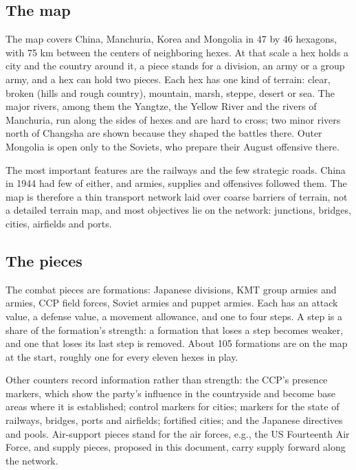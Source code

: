 \documentclass[11pt]{article}
\begin{document}
\subsection*{The map}
The map covers China, Manchuria, Korea and Mongolia in 47 by 46 hexagons, with 75 km between the centers of neighboring hexes. At that scale a hex holds a city and the country around it, a piece stands for a division, an army or a group army, and a hex can hold two pieces. Each hex has one kind of terrain: clear, broken (hills and rough country), mountain, marsh, steppe, desert or sea. The major rivers, among them the Yangtze, the Yellow River and the rivers of Manchuria, run along the sides of hexes and are hard to cross; two minor rivers north of Changsha are shown because they shaped the battles there. Outer Mongolia is open only to the Soviets, who prepare their August offensive there.

The most important features are the railways and the few strategic roads. China in 1944 had few of either, and armies, supplies and offensives followed them. The map is therefore a thin transport network laid over coarse barriers of terrain, not a detailed terrain map, and most objectives lie on the network: junctions, bridges, cities, airfields and ports.

\subsection*{The pieces}
The combat pieces are formations: Japanese divisions, KMT group armies and armies, CCP field forces, Soviet armies and puppet armies. Each has an attack value, a defense value, a movement allowance, and one to four steps. A step is a share of the formation's strength: a formation that loses a step becomes weaker, and one that loses its last step is removed. About 105 formations are on the map at the start, roughly one for every eleven hexes in play.

Other counters record information rather than strength: the CCP's presence markers, which show the party's influence in the countryside and become base areas where it is established; control markers for cities; markers for the state of railways, bridges, ports and airfields; fortified cities; and the Japanese directives and pools. Air-support pieces stand for the air forces, e.g., the US Fourteenth Air Force, and supply pieces, proposed in this document, carry supply forward along the network.
\end{document}
